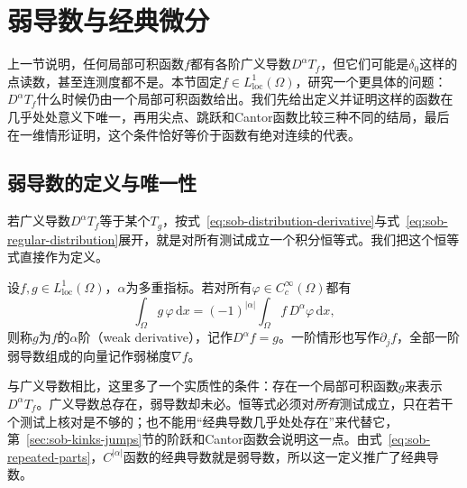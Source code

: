 
\section{弱导数与经典微分}
\label{sec:sob-weak-derivatives}

上一节说明，任何局部可积函数$f$都有各阶广义导数$D^\alpha T_f$，但它们可能是$\delta_0$这样的点读数，甚至连测度都不是。本节固定$f\in L^1_{\mathrm{loc}}(\Omega)$，研究一个更具体的问题：$D^\alpha T_f$什么时候仍由一个局部可积函数给出。我们先给出定义并证明这样的函数在几乎处处意义下唯一，再用尖点、跳跃和Cantor函数比较三种不同的结局，最后在一维情形证明，这个条件恰好等价于函数有绝对连续的代表。

\subsection{弱导数的定义与唯一性}
\label{sec:sob-weak-derivative-def}

若广义导数$D^\alpha T_f$等于某个$T_g$，按式~\eqref{eq:sob-distribution-derivative}与式~\eqref{eq:sob-regular-distribution}展开，就是对所有测试成立一个积分恒等式。我们把这个恒等式直接作为定义。

\begin{definition}[弱导数]
\label{def:sob-weak-derivative}
设$f,g\in L^1_{\mathrm{loc}}(\Omega)$，$\alpha$为多重指标。若对所有$\varphi\in C_c^\infty(\Omega)$都有
\begin{equation}
 \int_\Omega g\,\varphi\,\mathrm dx=(-1)^{|\alpha|}\int_\Omega f\,D^\alpha\varphi\,\mathrm dx ,
 \label{eq:sob-weak-derivative}
\end{equation}
则称$g$为$f$的$\alpha$阶（weak derivative），记作$D^\alpha f=g$。一阶情形也写作$\partial_jf$，全部一阶弱导数组成的向量记作弱梯度$\nabla f$。
\end{definition}

与广义导数相比，这里多了一个实质性的条件：存在一个局部可积函数$g$来表示$D^\alpha T_f$。广义导数总存在，弱导数却未必。恒等式必须对\emph{所有}测试成立，只在若干个测试上核对是不够的；也不能用“经典导数几乎处处存在”来代替它，第~\ref{sec:sob-kinks-jumps}节的阶跃和Cantor函数会说明这一点。由式~\eqref{eq:sob-repeated-parts}，$C^{|\alpha|}$函数的经典导数就是弱导数，所以这一定义推广了经典导数。

